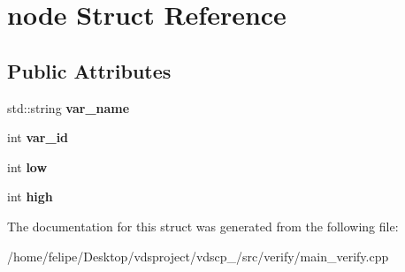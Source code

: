 \section{node Struct Reference}
\label{structnode}
\subsection*{Public Attributes}
\begin{DoxyCompactItemize}
\item 
std\+::string {\bfseries var\+\_\+name}\label{structnode_a6a26f5e7101293a34704c34ab2b8846f}

\item 
int {\bfseries var\+\_\+id}\label{structnode_a9349fd79d66c48b710644e0833b8d316}

\item 
int {\bfseries low}\label{structnode_a10be3a6d1a2699623bebe2e3b49eff08}

\item 
int {\bfseries high}\label{structnode_a87e109220475573c3aedddb10b68dc45}

\end{DoxyCompactItemize}


The documentation for this struct was generated from the following file\+:\begin{DoxyCompactItemize}
\item 
/home/felipe/\+Desktop/vdsproject/vdscp\+\_/src/verify/main\+\_\+verify.\+cpp\end{DoxyCompactItemize}
